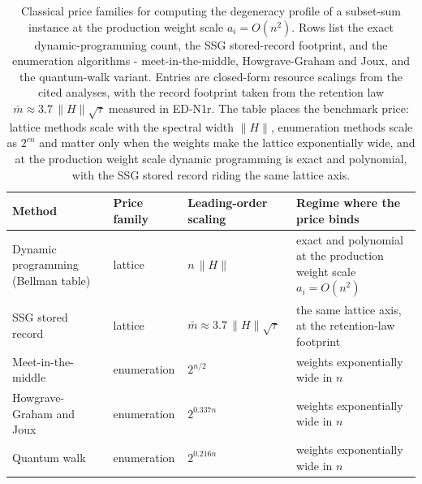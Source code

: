 \begin{table}[t]
\caption{Classical price families for computing the degeneracy profile of a subset-sum instance at the production weight scale $a_i = O(n^{2})$. Rows list the exact dynamic-programming count, the SSG stored-record footprint, and the enumeration algorithms - meet-in-the-middle, Howgrave-Graham and Joux, and the quantum-walk variant. Entries are closed-form resource scalings from the cited analyses, with the record footprint taken from the retention law $\bar m \approx 3.7\,\|H\|\sqrt{\tau}$ measured in ED-N1r. The table places the benchmark price: lattice methods scale with the spectral width $\|H\|$, enumeration methods scale as $2^{cn}$ and matter only when the weights make the lattice exponentially wide, and at the production weight scale dynamic programming is exact and polynomial, with the SSG stored record riding the same lattice axis.}
\label{tab:dp-price}
\begin{ruledtabular}
\begin{tabular}{llll}
\textbf{Method} & \textbf{Price family} & \textbf{Leading-order scaling} & \textbf{Regime where the price binds} \\ \hline
\parbox[t]{0.2\textwidth}{\raggedright Dynamic programming (Bellman table)\strut} & lattice & $n\,\|H\|$ & \parbox[t]{0.32\textwidth}{\raggedright exact and polynomial at the production weight scale $a_i = O(n^2)$\strut} \\
\parbox[t]{0.2\textwidth}{\raggedright SSG stored record\strut} & lattice & $\bar m \approx 3.7\,\|H\|\sqrt{\tau}$ & \parbox[t]{0.32\textwidth}{\raggedright the same lattice axis, at the retention-law footprint\strut} \\
\parbox[t]{0.2\textwidth}{\raggedright Meet-in-the-middle\strut} & enumeration & $2^{n/2}$ & \parbox[t]{0.32\textwidth}{\raggedright weights exponentially wide in $n$\strut} \\
\parbox[t]{0.2\textwidth}{\raggedright Howgrave-Graham and Joux\strut} & enumeration & $2^{0.337n}$ & \parbox[t]{0.32\textwidth}{\raggedright weights exponentially wide in $n$\strut} \\
\parbox[t]{0.2\textwidth}{\raggedright Quantum walk\strut} & enumeration & $2^{0.216n}$ & \parbox[t]{0.32\textwidth}{\raggedright weights exponentially wide in $n$\strut} \\
\end{tabular}
\end{ruledtabular}
\end{table}
